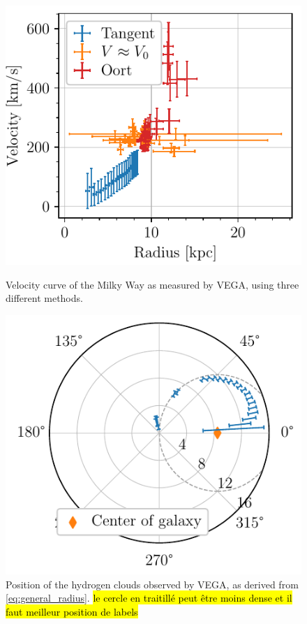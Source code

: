 \begin{figure}[htbp]
    \begin{minipage}[t]{0.5\textwidth}
        \centering
        \captionsetup{width=.95\textwidth}
        \includegraphics[scale=1]{figures/VEGA2_velocity_curve.pdf}
        \caption{Velocity curve of the Milky Way as measured by VEGA, using three different methods.}
        \label{fig:VEGA_velocity_curve}
    \end{minipage}
    \begin{minipage}[t]{0.5\textwidth}
        \centering
        \captionsetup{width=.95\textwidth}
        \includegraphics[scale=1]{figures/VEGA_galaxy_map.pdf}
        \caption{Position of the hydrogen clouds observed by VEGA, as derived from \autoref{eq:general_radius}. \hl{le cercle en traitillé peut être moins dense et il faut meilleur position de labels}}
        \label{fig:VEGA_galaxy_map}
    \end{minipage}
\end{figure}

